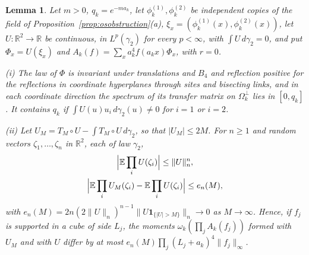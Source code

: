 \documentclass[aps,prd,twocolumn,superscriptaddress,nofootinbib,longbibliography,floatfix,amsmath,amssymb,10pt]{revtex4-2}
\newtheorem{lemma}[theorem]{Lemma}
\theoremstyle{definition}
\theoremstyle{remark}
\newcommand{\R}{\mathbb{R}}
\newcommand{\E}{\mathbb{E}}
\begin{document}
\begin{lemma}\label{lem:limitEtrunc}
Let $m>0$, $q_k=e^{-ma_k}$, let $\phi^{(1)}_k,\phi^{(2)}_k$ be independent
copies of the field of Proposition~\textup{\ref{prop:osobstruction}(a)},
$\xi_x=(\phi^{(1)}_k(x),\phi^{(2)}_k(x))$, let $U\colon\R^2\to\R$ be
continuous, in $L^p(\gamma_2)$ for every $p<\infty$, with $\int
U\,d\gamma_2=0$, and put $\Phi_x=U(\xi_x)$ and $A_k(f)=\sum_xa_k^4f(a_kx)
\Phi_x$, with $r=0$.

\textup{(i)} The law of $\Phi$ is invariant under translations and $B_4$ and
reflection positive for the reflections in coordinate hyperplanes through
sites and bisecting links, and in each coordinate direction the spectrum of
its transfer matrix on $\Omega_k^\perp$ lies in $[0,q_k]$. It contains $q_k$
if $\int U(u)u_i\,d\gamma_2(u)\ne0$ for $i=1$ or $i=2$.

\textup{(ii)} Let $U_M=T_M\circ U-\int T_M\circ U\,d\gamma_2$, so that
$|U_M|\le2M$. For $n\ge1$ and random vectors $\zeta_1,\dots,\zeta_n$ in
$\R^2$, each of law $\gamma_2$,
\begin{gather*}
\Bigl|\E\prod_iU(\zeta_i)\Bigr|\le\|U\|_n^n,\\
\Bigl|\E\prod_iU_M(\zeta_i)-\E\prod_iU(\zeta_i)\Bigr|\le e_n(M),
\end{gather*}
with $e_n(M)=2n(2\|U\|_n)^{n-1}\|U\mathbf 1_{\{|U|>M\}}\|_n\to0$ as
$M\to\infty$. Hence, if $f_j$ is supported in a cube of side $L_j$, the
moments $\omega_k(\prod_jA_k(f_j))$ formed with $U_M$ and with $U$ differ by
at most $e_n(M)\prod_j(L_j+a_k)^4\|f_j\|_\infty$.
\end{lemma}
\end{document}
